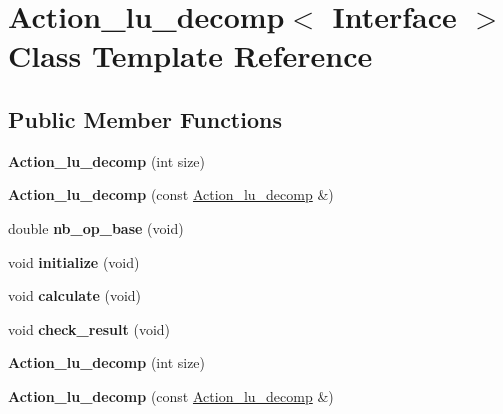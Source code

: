 \hypertarget{class_action__lu__decomp}{}\section{Action\+\_\+lu\+\_\+decomp$<$ Interface $>$ Class Template Reference}
\label{class_action__lu__decomp}
\subsection*{Public Member Functions}
\begin{DoxyCompactItemize}
\item 
\mbox{\label{class_action__lu__decomp_afaa493055b1449830b156c690eb30e14}} 
{\bfseries Action\+\_\+lu\+\_\+decomp} (int size)
\item 
\mbox{\label{class_action__lu__decomp_a9539821098a5471f0a31e0acb2db9dc9}} 
{\bfseries Action\+\_\+lu\+\_\+decomp} (const \hyperlink{class_action__lu__decomp}{Action\+\_\+lu\+\_\+decomp} \&)
\item 
\mbox{\label{class_action__lu__decomp_a381d0374009d61ad08fbb5999b2fc707}} 
double {\bfseries nb\+\_\+op\+\_\+base} (void)
\item 
\mbox{\label{class_action__lu__decomp_a065c46760336805cac70deaccfd02509}} 
void {\bfseries initialize} (void)
\item 
\mbox{\label{class_action__lu__decomp_a5169d51b797f4e14aa889ffe131e6725}} 
void {\bfseries calculate} (void)
\item 
\mbox{\label{class_action__lu__decomp_aad26b74edbf61c61acefd2d9060284a3}} 
void {\bfseries check\+\_\+result} (void)
\item 
\mbox{\label{class_action__lu__decomp_afaa493055b1449830b156c690eb30e14}} 
{\bfseries Action\+\_\+lu\+\_\+decomp} (int size)
\item 
\mbox{\label{class_action__lu__decomp_a9539821098a5471f0a31e0acb2db9dc9}} 
{\bfseries Action\+\_\+lu\+\_\+decomp} (const \hyperlink{class_action__lu__decomp}{Action\+\_\+lu\+\_\+decomp} \&)

\end{DoxyCompactItemize}
